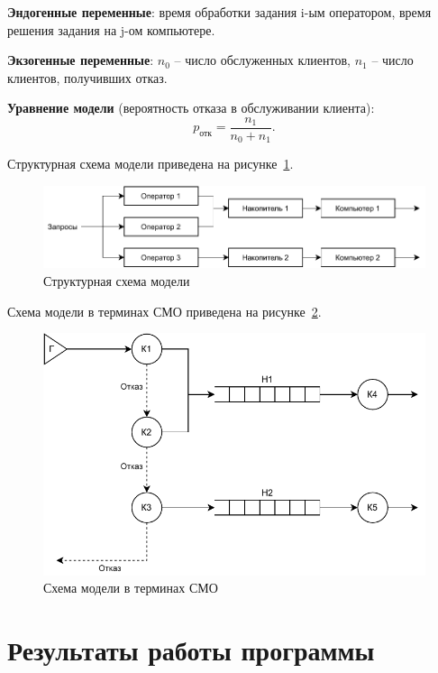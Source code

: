 \documentclass[14pt, a4paper]{extarticle}
\begin{document}
\textbf{Эндогенные переменные}: время обработки задания i-ым оператором,  время решения задания на j-ом компьютере.

\textbf{Экзогенные переменные}: $n_0$ -- число обслуженных клиентов, $n_1$ -- число  клиентов, получивших отказ.

\textbf{Уравнение модели} (вероятность отказа в обслуживании клиента):
\begin{equation}
	p_{\textit{отк}} = \frac{n_1}{n_0+n_1}.
\end{equation}

Структурная схема модели приведена на рисунке~\ref{pic:01}.
\begin{figure}[h]
	\begin{center}
		{\includegraphics[scale=0.85]{pictures/1.pdf}
			\caption{Структурная схема модели}
			\label{pic:01}}
	\end{center}
\end{figure}


Схема модели в терминах СМО приведена на рисунке~\ref{pic:02}.
\begin{figure}[h]
	\begin{center}
		{\includegraphics[scale=0.85]{pictures/2.pdf}
			\caption{Схема модели в терминах СМО}
			\label{pic:02}}
	\end{center}
\end{figure}

\section{Результаты работы программы}
\end{document}
